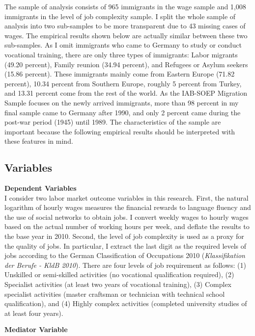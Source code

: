 \documentclass[12pt,a4paper]{article}
\begin{document}
The sample of analysis consists of 965 immigrants in the wage sample and 1,008 immigrants in the level of job complexity sample. I split the whole sample of analysis into two sub-samples to be more transparent due to 43 missing cases of wages. The empirical results shown below are actually similar between these two sub-samples. As I omit immigrants who came to Germany to study or conduct vocational training, there are only three types of immigrants: Labor migrants (49.20 percent), Family reunion (34.94 percent), and Refugees or Asylum seekers (15.86 percent). These immigrants mainly come from Eastern Europe (71.82 percent), 10.34 percent from Southern Europe, roughly 5 percent from Turkey, and 13.31 percent come from the rest of the world. As the IAB-SOEP Migration Sample focuses on the newly arrived immigrants, more than 98 percent in my final sample came to Germany after 1990, and only 2 percent came during the post-war period (1945) until 1989. The characteristics of the sample are important because the following empirical results should be interpreted with these features in mind.

\subsection{Variables}
\textbf{Dependent Variables} \\
I consider two labor market outcome variables in this research. First, the natural logarithm of hourly wages measures the financial rewards to language fluency and the use of social networks to obtain jobs. I convert weekly wages to hourly wages based on the actual number of working hours per week, and deflate the results to the base year in 2010. Second, the level of job complexity is used as a proxy for the quality of jobs. In particular, I extract the last digit as the required levels of jobs according to the German Classification of Occupations 2010 (\textit{Klassifikation der Berufe - KldB 2010}). There are four levels of job requirement as follows: (1) Unskilled or semi-skilled activities (no vocational qualification required), (2) Specialist activities (at least two years of vocational training), (3) Complex specialist activities (master craftsman or technician with technical school qualification), and (4) Highly complex activities (completed university studies of at least four years). 

\begin{flushleft}
\textbf{Mediator Variable} 
\end{flushleft}
\end{document}
